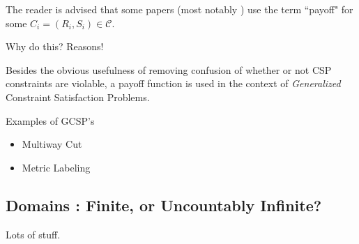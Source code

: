 The reader is advised that some papers (most notably \cite{RagSte09}) use the term ``payoff" for some $C_i = (R_i,S_i) \in \mathcal{C}$. 

Why do this? Reasons!

Besides the obvious usefulness of removing confusion of whether or not CSP constraints are violable, a payoff function is used in the context of \textit{Generalized} Constraint Satisfaction Problems.

Examples of GCSP's
\begin{itemize}
\item Multiway Cut
\item Metric Labeling
\end{itemize}

\subsection{Domains : Finite, or Uncountably Infinite?}
Lots of stuff\cite{Russell2009}.

%
